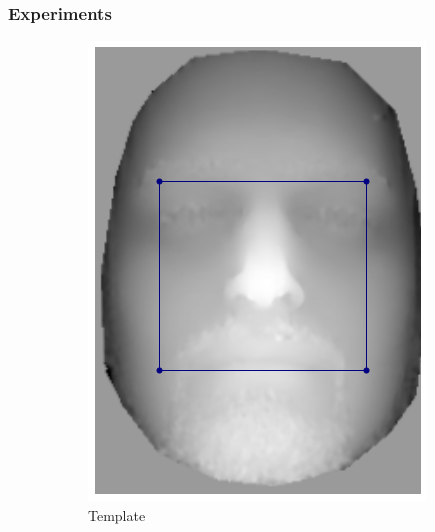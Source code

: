 \subsubsection{Experiments}\label{subsubsec:singl_img_2d_lk_experiments}
\begin{figure}[t]
    \centering
    \hspace*{\fill}
    \begin{subfigure}[b]{0.3\textwidth}
    	\includegraphics[width=\textwidth]{statistical_normals/images/lk2d/bs004_template.png}
    	\caption{Template}\label{subfig:singl_img_depth_2d_lk_template}
    \end{subfigure} \hfill
    \begin{subfigure}[b]{0.3\textwidth}

\end{subfigure}
\end{figure}
